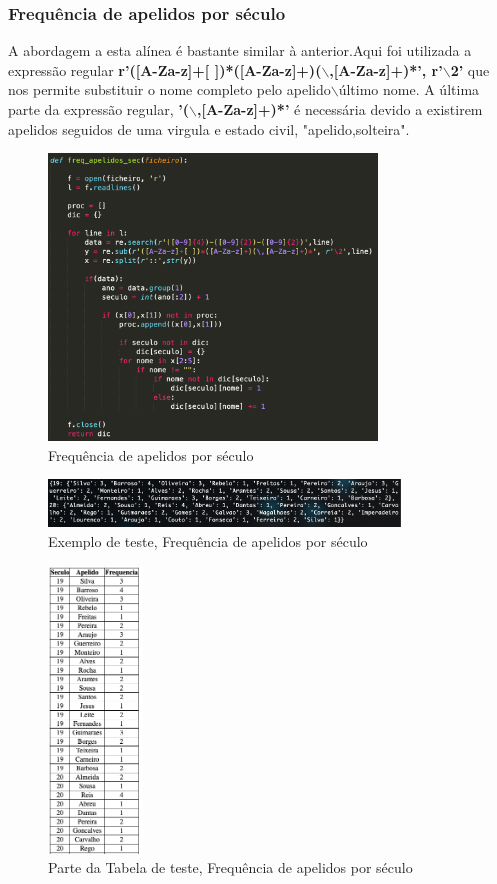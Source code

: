 \documentclass[a4paper, 12pt]{article}
\begin{document}
\subsubsection{Frequência de apelidos por século}
A abordagem a esta alínea é bastante similar à anterior.Aqui foi utilizada a expressão regular \textbf{r'([A-Za-z]+[ ])*([A-Za-z]+)($\backslash$,[A-Za-z]+)*', r'$\backslash$2'} que nos permite substituir o nome completo pelo apelido$\backslash$último nome. A última parte da expressão regular, \textbf{'($\backslash$,[A-Za-z]+)*'} é necessária devido a existirem apelidos seguidos de uma virgula e estado civil, "apelido,solteira". 
\begin{figure}[H]
    \centering
    \includegraphics[height=3in]{freq_apelidos_sec.png}
    \caption{Frequência de apelidos por século}
    \label{fig:my_label}
\end{figure}
\begin{figure}[H]
    \centering
    \includegraphics[height=0.5in]{freq_apelidos_sec-teste.png}
    \caption{Exemplo de teste, Frequência de apelidos por século}
    \label{fig:my_label}
\end{figure}
\begin{figure}[H]
    \centering
    \includegraphics[height=3in]{freq_apelidos-tabela.png}
    \caption{Parte da Tabela de teste, Frequência de apelidos por século}
    \label{fig:my_label}
\end{figure}
\newpage
\end{document}
